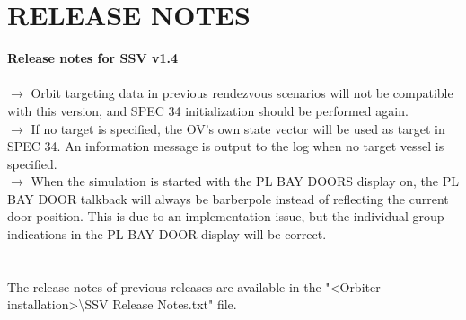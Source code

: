 \documentclass[Space_Shuttle_Vessel_Manual.tex]{subfiles}
\begin{document}
\section{RELEASE NOTES}
\label{sec:release-notes}
\noindent
\textbf{Release notes for SSV v1.4}\\\\
$\rightarrow$ Orbit targeting data in previous rendezvous scenarios will not be compatible with this version, and SPEC 34 initialization should be performed again.\\
$\rightarrow$ If no target is specified, the OV's own state vector will be used as target in SPEC 34. An information message is output to the log when no target vessel is specified.\\
$\rightarrow$ When the simulation is started with the PL BAY DOORS display on, the PL BAY DOOR talkback will always be barberpole instead of reflecting the current door position. This is due to an implementation issue, but the individual group indications in the PL BAY DOOR display will be correct.\\
\\
\\
The release notes of previous releases are available in the "<Orbiter installation>\textbackslash SSV Release Notes.txt" file.
\end{document}
